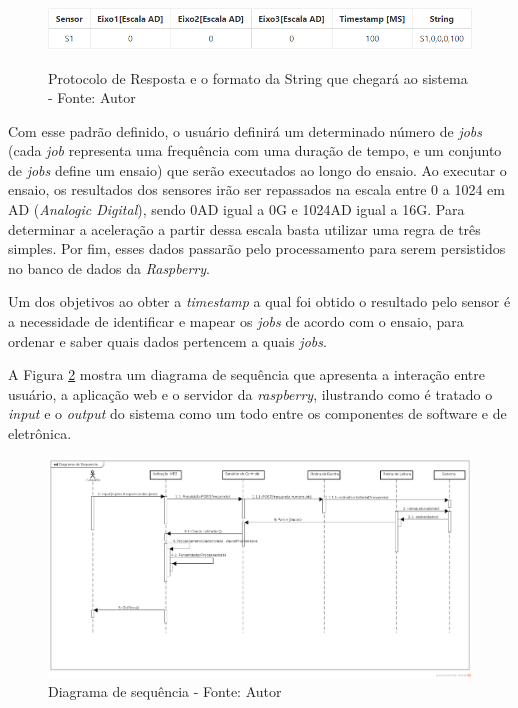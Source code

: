 \begin{figure}[H]
\centering
\includegraphics[keepaspectratio=true,scale=0.8]{figuras/protocolo_string.png}
\label{fig:protocolo_string}
\caption{Protocolo de Resposta e o formato da String que chegará ao sistema - Fonte: Autor}
\end{figure}

Com esse padrão definido, o usuário definirá um determinado número de \textit{jobs} (cada \textit{job} representa uma frequência com uma duração de tempo, 
e um conjunto de \textit{jobs} define um ensaio) que serão executados ao longo do ensaio. Ao executar o ensaio, os resultados dos sensores irão ser 
repassados na escala entre 0 a 1024 em AD (\textit{Analogic Digital}), sendo 0AD igual a 0G e 1024AD igual a 16G. Para determinar a aceleração a 
partir dessa escala basta utilizar uma regra de três simples. Por fim, esses dados passarão pelo processamento para serem persistidos no
banco de dados da \textit{Raspberry}.

Um dos objetivos ao obter a \textit{timestamp} a qual foi obtido o resultado pelo sensor é a necessidade de identificar e mapear os
\textit{jobs} de acordo com o ensaio, para ordenar e saber quais dados pertencem a quais \textit{jobs}.

A Figura \ref{fig:diagrama_sequencia_pc2} mostra um diagrama de sequência que apresenta a interação entre usuário, a aplicação web e o servidor da \textit{raspberry},
ilustrando como é tratado o \textit{input} e o \textit{output} do sistema como um todo entre os componentes de software e de eletrônica.

\begin{figure}[ht]
\label{fig:diagrama_sequencia_pc2}
\centering
\includegraphics[keepaspectratio=true,scale=0.5,angle=90]{figuras/diagrama_sequencia.png}
\caption{Diagrama de sequência - Fonte: Autor}
\end{figure}
